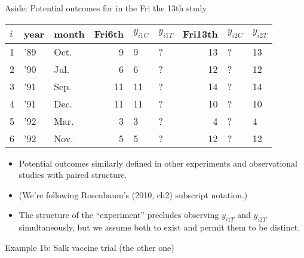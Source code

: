 \begin{frame}{Aside: Potential outcomes for in the Fri the 13th study}

  \begin{center}
    \begin{tabular}{ll|l|r|l|l|r|l|l}
\hline
$i$ &year & month & Fri6th & $y_{i1C}$ & $y_{i1T}$ & Fri13th & $y_{i2C}$ & $y_{i2T}$\\
\hline
1 & '89 & Oct. & 9 & 9  & ? & 13 & ? & 13  \\
\hline                                  
2 & '90 & Jul. & 6 & 6  & ? & 12 & ? & 12  \\
\hline                                  
3 & '91 & Sep. & 11 & 11 & ? & 14 & ? & 14  \\
\hline                                  
4 & '91 & Dec. & 11 & 11 & ? & 10 & ? & 10  \\
\hline                                  
5 & '92 & Mar. & 3 & 3  & ? & 4 &  ? &4\\
\hline                                  
6 & '92 & Nov. & 5 & 5  & ? & 12 & ? & 12  \\
\hline
\end{tabular}

\end{center}

\begin{itemize}
\item Potential outcomes similarly defined in other experiments and
  observational studies with paired structure.  
\item (We're following Rosenbaum's (2010, ch2) subscript notation.)
\item  The structure of the ``experiment'' precludes observing $y_{i1T}$
 and $y_{i2T}$ simultaneously, but we assume both to exist and permit
 them to be distinct.
\end{itemize}  
\end{frame}


\begin{frame}{Example 1b: Salk vaccine trial (the other one)}

\end{frame}




